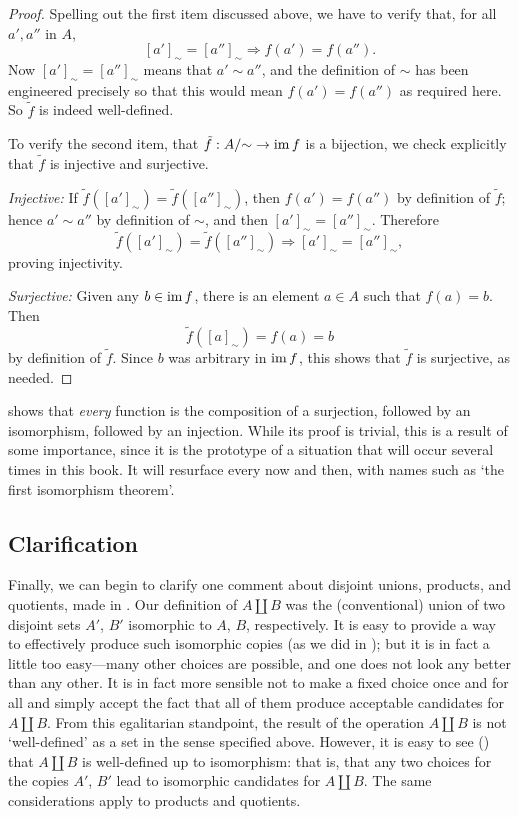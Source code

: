 \begin{proof}
  Spelling out the first item discussed above, we have to verify that,
  for all $a', a''$ in $A$,
  \[ {[a']}_\sim = {[a'']}_\sim \Rightarrow f(a') = f(a''). \] Now
  ${[a']}_\sim = {[a'']}_\sim$ means that $a' \sim a''$, and the
  definition of $\sim$ has been engineered precisely so that this
  would mean $f(a') = f(a'')$ as required here. So $\tilde{f}$ is
  indeed well-defined.

  To verify the second item, that $\tilde{f} : A/{\sim} \to \operatorname{im} f$
  is a bijection, we check explicitly that $\tilde{f}$ is injective
  and surjective.

  \emph{Injective:} If
  $\tilde{f}({[a']}_\sim) = \tilde{f}({[a'']}_\sim)$, then
  $f(a') = f(a'')$ by definition of $\tilde{f}$; hence $a' \sim a''$
  by definition of $\sim$, and then ${[a']}_\sim =
  {[a'']}_\sim$. Therefore
  \[ \tilde{f}({[a']}_\sim) = \tilde{f}({[a'']}_\sim) \Rightarrow
    {[a']}_\sim = {[a'']}_\sim, \] proving injectivity.

  \emph{Surjective:} Given any $b \in \operatorname{im} f$, there is an element
  $a \in A$ such that $f(a) = b$. Then
  \[ \tilde{f}({[a]}_\sim) = f(a) = b \] by definition of
  $\tilde{f}$. Since $b$ was arbitrary in $\operatorname{im} f$, this shows that
  $\tilde{f}$ is surjective, as needed.
\end{proof}

 shows that \emph{every} function is
the composition of a surjection, followed by an isomorphism, followed
by an injection. While its proof is trivial, this is a result of some
importance, since it is the prototype of a situation that will occur
several times in this book. It will resurface every now and then, with
names such as `the first isomorphism theorem'.

\subsection{Clarification}%
\label{subsec:prelims:clarification}

Finally, we can begin to clarify one comment about disjoint unions,
products, and quotients, made in
. Our definition of
$A \amalg B$ was the (conventional) union of two disjoint sets $A'$,
$B'$ isomorphic to $A$, $B$, respectively. It is easy to provide a way
to effectively produce such isomorphic copies (as we did in
); but it is in fact
a little too easy---many other choices are possible, and one does not
look any better than any other. It is in fact more sensible not to
make a fixed choice once and for all and simply accept the fact that
all of them produce acceptable candidates for $A \amalg B$. From this
egalitarian standpoint, the result of the operation $A \amalg B$ is
not `well-defined' as a set in the sense specified above. However, it
is easy to see () that $A \amalg B$
is well-defined up to isomorphism: that is, that any two choices for
the copies $A'$, $B'$ lead to isomorphic candidates for $A \amalg
B$. The same considerations apply to products and quotients.

